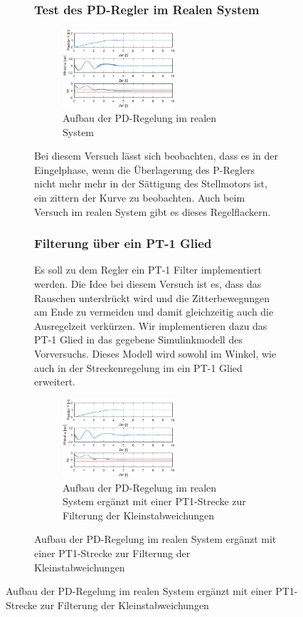 \documentclass[10pt]{scrartcl}
\begin{document}
\begin{figure}[H]
\begin{figure}
\subsubsection{Test des PD-Regler im Realen System}
\begin{figure}[H]
	\centering
	\includegraphics[width=0.6\textwidth]{PD-ReglerTestReal}
	\caption{Aufbau der PD-Regelung im realen System}
	\label{img:grafik-dummy}
\end{figure}
Bei diesem Versuch lässt sich beobachten, dass es in der Eingelphase, wenn die Überlagerung des P-Reglers nicht mehr mehr in der Sättigung des Stellmotors ist, ein zittern der Kurve zu beobachten. Auch beim Versuch im realen System gibt es dieses Regelflackern.

\subsubsection{Filterung über ein PT-1 Glied}
Es soll zu dem Regler ein PT-1 Filter implementiert werden. Die Idee bei diesem Versuch ist es, dass das Rauschen unterdrückt wird und die Zitterbewegungen am Ende zu vermeiden und damit gleichzeitig auch die Ausregelzeit verkürzen. Wir implementieren dazu das PT-1 Glied in das gegebene Simulinkmodell des Vorversuchs. Dieses Modell wird sowohl im Winkel, wie auch in der Streckenregelung im ein PT-1 Glied erweitert.

\begin{figure}[H]
	\centering
	\includegraphics[width=0.6\textwidth]{Figure45b1}
	\caption{Aufbau der PD-Regelung im realen System ergänzt mit einer PT1-Strecke zur Filterung der Kleinstabweichungen}
	\label{img:grafik-dummy}
\end{figure}


\end{figure}
\end{figure}
\end{document}
